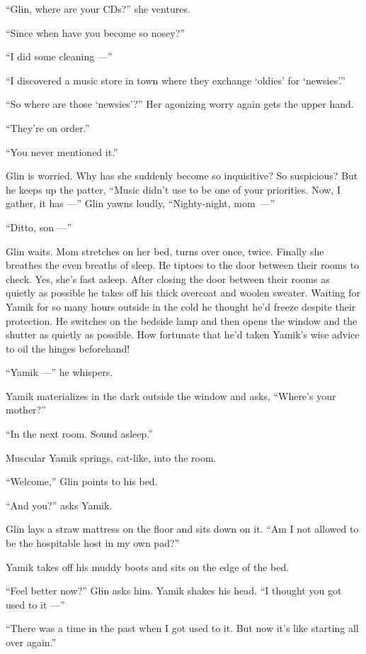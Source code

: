 \documentclass[twoside,11pt,openany]{book}
\begin{document}
``Glin, where are your CDs?''  she ventures.

``Since when have you become so nosey?''

``I did some cleaning ---''

``I discovered a music store in town where they exchange `oldies' for
`newsies'.''

``So where are those `newsies{}'?'' Her agonizing worry again gets the upper hand.

``They're on order.''

``You never mentioned it.''

Glin is worried. Why has she suddenly become so inquisitive? So suspicious? But he keeps up the patter,
``Music didn't use to be one of your priorities. Now, I gather, it has ---'' Glin yawns
loudly{,} ``Nighty-night, mom~---''

``Ditto, son ---''

Glin waits. Mom stretches on her bed, turns over once, twice. Finally she breathes the even breaths of sleep. He
tiptoes to the door between their rooms to check. Yes, she's fast asleep. After closing the door between their rooms
as quietly as possible he takes off his thick overcoat and woolen sweater. Waiting for Yamik for so many hours outside
in the cold he thought he'd freeze despite their protection. He switches on the bedside lamp and then opens the window
and the shutter as quietly as possible. How fortunate that he'd
taken Yamik's wise advice to oil the hinges beforehand!

 ``Yamik ---'' he whispers.

Yamik materializes in the dark outside the window and asks, ``Where's your mother?''

``In the next room. Sound asleep.''

Muscular Yamik springs, cat-like, into the room.

``Welcome,'' Glin points to his bed.

``And you?'' asks Yamik.

Glin lays a straw mattress on the floor and sits down on it. ``Am I not allowed to be the hospitable host
in my own pad?''

Yamik takes off his muddy boots and sits on the edge of the bed.

``Feel better now?'' Glin asks him. Yamik shakes his
head.{ }``I thought you got used to it ---''

``There was a time in the past when I got used to it. But now it's like starting all over
again.''
\end{document}
